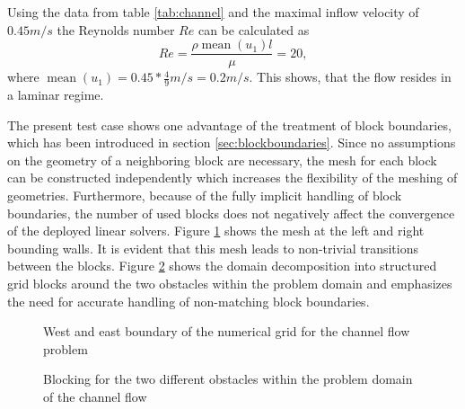 Using the data from table \ref{tab:channel} and the maximal inflow velocity of $0.45m/s$ the Reynolds number \(Re\) can be calculated as
\begin{displaymath}
  Re = \frac{\rho \operatorname{mean}(u_1) l}{\mu} = 20,
\end{displaymath}
where \(\operatorname{mean}(u_1) = 0.45*\frac{4}{9} m/s = 0.2 m/s\). This shows, that the flow resides in a laminar regime.

The present test case shows one advantage of the treatment of block boundaries, which has been introduced in section \ref{sec:blockboundaries}. Since no assumptions on the geometry of a neighboring block are necessary, the mesh for each block can be constructed independently which increases the flexibility of the meshing of geometries. Furthermore, because of the fully implicit handling of block boundaries, the number of used blocks does not negatively affect the convergence of the deployed linear solvers. Figure \ref{fig:channel1} shows the mesh at the left and right bounding walls. It is evident that this mesh leads to non-trivial transitions between the blocks. Figure \ref{fig:blocking} shows the domain decomposition into structured grid blocks around the two obstacles within the problem domain and emphasizes the need for accurate handling of non-matching block boundaries.

\begin{figure}
  \centering
  
  \caption{West and east boundary of the numerical grid for the channel flow problem}
  \label{fig:channel1}
\end{figure}

%  

\begin{figure}
   \centering
    \hfil
    \caption{Blocking for the two different obstacles within the problem domain of the channel flow}
    \label{fig:blocking}
\end{figure}

